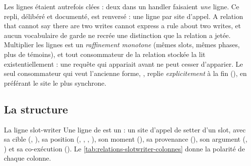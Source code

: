 \begin{decision}
Les lignes étaient autrefois clées  : deux  dans un handler faisaient \emph{une} ligne. Ce repli, délibéré et documenté, est renversé : une ligne par site d'appel. \og A relation that cannot say there are two writes cannot express a rule about two writes\fg{}, et aucun vocabulaire de garde ne recrée une distinction que la relation a jetée. Multiplier les lignes est un \emph{raffinement monotone} (mêmes slots, mêmes phases, plus de témoins), et tout consommateur de la relation stockée la lit existentiellement : une requête qui appariait avant ne peut cesser d'apparier. Le seul consommateur qui veut l'ancienne forme, , replie \emph{explicitement} à la fin (), en préférant le site le plus synchrone.
\end{decision}

\subsection{La structure}


\begin{definition}{La ligne }{slot-writer}
Une ligne de  est un  : un site d'appel de setter d'un slot, avec sa cible (, ), sa position (, , , ), son moment (), sa provenance (), son argument (, ) et sa co-exécution (). Le \cref{tab:relations-slotwriter-colonnes} donne la polarité de chaque colonne.
\end{definition}

